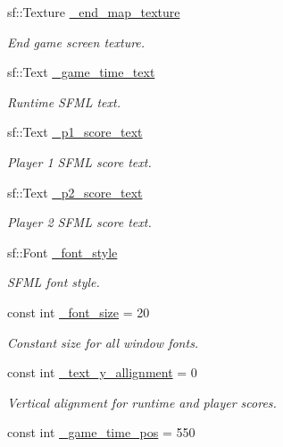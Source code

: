 \begin{DoxyCompactItemize}
sf\-::\-Texture \hyperlink{classDisplay_ad41d7097510e56a9f16e97d7cc13c5b6}{\-\_\-end\-\_\-map\-\_\-texture}
\begin{DoxyCompactList}\small\item\em End game screen texture. \end{DoxyCompactList}\item 
sf\-::\-Text \hyperlink{classDisplay_a36007f3ed0cb7f8174ef601dbde3adab}{\-\_\-game\-\_\-time\-\_\-text}
\begin{DoxyCompactList}\small\item\em Runtime S\-F\-M\-L text. \end{DoxyCompactList}\item 
sf\-::\-Text \hyperlink{classDisplay_a0545991d352f9d4e7bda7d2f3b6a0236}{\-\_\-p1\-\_\-score\-\_\-text}
\begin{DoxyCompactList}\small\item\em Player 1 S\-F\-M\-L score text. \end{DoxyCompactList}\item 
sf\-::\-Text \hyperlink{classDisplay_a80ea7a2642db4a379d756b0132d26343}{\-\_\-p2\-\_\-score\-\_\-text}
\begin{DoxyCompactList}\small\item\em Player 2 S\-F\-M\-L score text. \end{DoxyCompactList}\item 
sf\-::\-Font \hyperlink{classDisplay_a937e4b846d090d1d520e15d6233bbfc0}{\-\_\-font\-\_\-style}
\begin{DoxyCompactList}\small\item\em S\-F\-M\-L font style. \end{DoxyCompactList}\item 
const int \hyperlink{classDisplay_ae10066fc5854e77ea65d3a64912b079a}{\-\_\-font\-\_\-size} = 20
\begin{DoxyCompactList}\small\item\em Constant size for all window fonts. \end{DoxyCompactList}\item 
const int \hyperlink{classDisplay_ae85ee765b92689445aca8cead24d8184}{\-\_\-text\-\_\-y\-\_\-allignment} = 0
\begin{DoxyCompactList}\small\item\em Vertical alignment for runtime and player scores. \end{DoxyCompactList}\item 
const int \hyperlink{classDisplay_ad9b50fa7903081469111841965b995ba}{\-\_\-game\-\_\-time\-\_\-pos} = 550

\end{DoxyCompactItemize}
